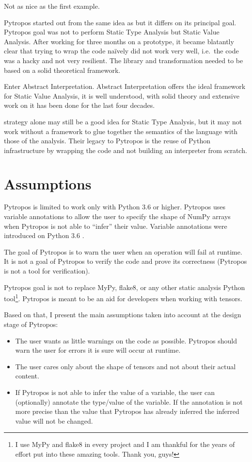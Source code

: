 Not as nice as the first example.

Pytropos started out from the same idea as \textcite{ortin_towards_2015}
but it differs on its principal goal. Pytropos goal was not to perform
Static Type Analysis but Static Value Analysis. After working for three
months on a prototype, it became blatantly clear that trying to wrap the
code naïvely did not work very well, i.e.~the code was a hacky and not
very resilient. The library and transformation needed to be based on a
solid theoretical framework.

Enter Abstract Interpretation. Abstract Interpretation offers the ideal
framework for Static Value Analysis, it is well understood, with solid
theory and extensive work on it has been done for the last four decades.

\textcite{ortin_towards_2015} strategy alone may still be a good idea
for Static Type Analysis, but it may not work without a framework to
glue together the semantics of the language with those of the analysis.
Their legacy to Pytropos is the reuse of Python infrastructure by
wrapping the code and not building an interpreter from scratch.

\section{Assumptions}\label{assumptions}

Pytropos is limited to work only with Python 3.6 or higher. Pytropos
uses variable annotations to allow the user to specify the shape of
NumPy arrays when Pytropos is not able to \enquote{infer} their value.
Variable annotations were introduced on Python 3.6 \autocite{pep526}.

The goal of Pytropos is to warn the user when an operation will fail at runtime. It is not
a goal of Pytropos to verify the code and prove its correctness (Pytropos is not a tool
for verification).

Pytropos goal is not to replace MyPy, flake8, or any other static
analysis Python tool\footnote{I use MyPy and flake8 in every project and
  I am thankful for the years of effort put into these amazing tools.
  Thank you, guys!}. Pytropos is meant to be an aid for developers when
working with tensors.

Based on that, I present the main assumptions taken into account at the design stage of
Pytropos:

\begin{itemize}
\tightlist
\item The user wants as little warnings on the code as possible. Pytropos should warn the
  user for errors it is sure will occur at runtime.
\item The user cares only about the shape of tensors and not about their actual content.
\item If Pytropos is not able to infer the value of a variable, the user can (optionally)
  annotate the type/value of the variable. If the annotation is not more precise than the
  value that Pytropos has already inferred the inferred value will not be changed.
\end{itemize}

